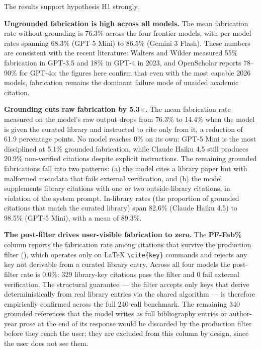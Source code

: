 The results support hypothesis H1 strongly.

\textbf{Ungrounded fabrication is high across all models.} The mean fabrication rate without grounding is 76.3\% across the four frontier models, with per-model rates spanning 68.3\% (GPT-5 Mini) to 86.5\% (Gemini 3 Flash). These numbers are consistent with the recent literature: Walters and Wilder \cite{walters2023fabrication} measured 55\% fabrication in GPT-3.5 and 18\% in GPT-4 in 2023, and OpenScholar \cite{asai2025openscholar} reports 78--90\% for GPT-4o; the figures here confirm that even with the most capable 2026 models, fabrication remains the dominant failure mode of unaided academic citation.

\textbf{Grounding cuts raw fabrication by 5.3$\times$.} The mean fabrication rate measured on the model's raw output drops from 76.3\% to 14.4\% when the model is given the curated library and instructed to cite only from it, a reduction of 61.9 percentage points. No model reaches 0\% on its own: GPT-5 Mini is the most disciplined at 5.1\% grounded fabrication, while Claude Haiku 4.5 still produces 20.9\% non-verified citations despite explicit instructions. The remaining grounded fabrications fall into two patterns: (a) the model cites a library paper but with malformed metadata that fails external verification, and (b) the model supplements library citations with one or two outside-library citations, in violation of the system prompt. In-library rates (the proportion of grounded citations that match the curated library) span 82.6\% (Claude Haiku 4.5) to 98.5\% (GPT-5 Mini), with a mean of 89.3\%.

\textbf{The post-filter drives user-visible fabrication to zero.} The \textbf{PF-Fab\%} column reports the fabrication rate among citations that survive the production filter (), which operates only on LaTeX \texttt{\textbackslash cite\{key\}} commands and rejects any key not derivable from a curated library entry. Across all four models the post-filter rate is 0.0\%: 329 library-key citations pass the filter and 0 fail external verification. The structural guarantee --- the filter accepts only keys that derive deterministically from real library entries via the shared  algorithm --- is therefore empirically confirmed across the full 240-call benchmark. The remaining 340 grounded references that the model writes as full bibliography entries or author-year prose at the end of its response would be discarded by the production filter before they reach the user; they are excluded from this column by design, since the user does not see them.

